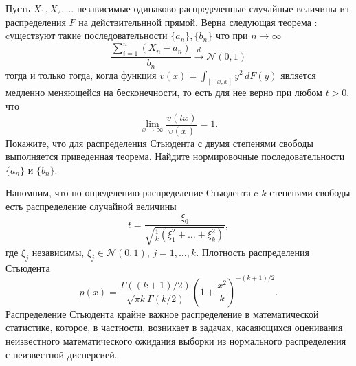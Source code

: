 \begin{problem}
Пусть $X_1,X_2, 
\dots$ независимые одинаково распределенные случайные величины из распределения $F$ на действительнной прямой.  Верна следующая теорема 
\cite{Gupta}: cуществуют такие последовательности $\{a_n\},\{b_n\}$ что при $n\to \infty$ $$\frac{\sum_{i=1}^n(X_n-a_n)}{b_n}\xrightarrow{d} \mathcal{N}(0,1)$$ тогда и только тогда, когда функция $v(x) = \int_{[-x,x]}y^2\,dF(y)$ является медленно меняющейся на бесконечности, то есть для нее верно при любом $t>0$, что $$\lim_{x\to\infty}\frac{v(tx)}{v(x)}=1.$$ 
Покажите, что для  распределения Стьюдента с двумя степенями свободы выполняется приведенная теорема. Найдите нормировочные последовательности $\{a_n\}$ и $\{b_n\}$.
\end{problem}
 \begin{remark}
 Напомним, что по определению распределение Стьюдента c $k$ степенями свободы есть распределение случайной величины $$t = \frac{\xi_0}{\sqrt{\frac{1}{k}(\xi^2_1+\dots+\xi^2_k)}},$$
 где $\xi_j$ независимы, $\xi_j\in \mathcal{N}(0,1)$, $j=1,\dots,k$. Плотность распределения Стьюдента 
 $$
 p(x) = \frac{\Gamma((k+1)/2)}{\sqrt{\pi k}\Gamma(k/2)} \left(1+\frac{x^2}{k}\right)^{-(k+1)/2}.
 $$
 Распределение Стьюдента крайне важное распределение в математической статистике, которое, в частности, возникает в задачах, касаяющихся оценивания неизвестного математического ожидания выборки из нормального распределения с неизвестной дисперсией.
 \end{remark}

